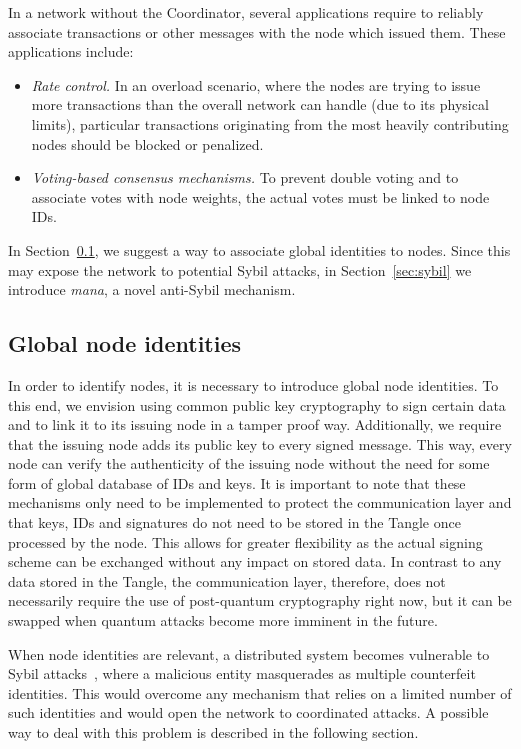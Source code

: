 \documentclass[../main.tex]{subfiles}
\begin{document}
In a network without the Coordinator, several applications require to reliably associate transactions or other messages with the node which issued them.
These applications include:

\begin{itemize}
    \item \textit{Rate control.}
    In an overload scenario, where the nodes are trying to issue more transactions than the overall network can handle (due to its physical limits), 
    particular transactions originating from the most heavily 
    contributing nodes should be blocked or penalized.
    \item \textit{Voting-based consensus mechanisms.}
    To prevent double voting and to associate votes with node weights, the actual votes must be linked to node IDs.
\end{itemize}

In Section~\ref{sec:global-node-id}, we suggest a way to associate global identities to nodes. Since this may expose the network to potential Sybil attacks, in Section~\ref{sec:sybil} we introduce \textit{mana}, a novel anti-Sybil mechanism. 

\subsection{Global node identities}\label{sec:global-node-id}

In order to identify nodes, it is necessary to introduce global node identities.
To this end, we envision using common public key cryptography to sign certain data and to link it to its issuing node in a tamper proof way.
Additionally, we require that the issuing node adds its public key to every signed message.
This way, every node can verify the authenticity of the issuing node without the need for some form of global database of IDs and keys.
It is important to note that these mechanisms only need to be implemented to protect the communication layer and that keys, IDs and signatures do not need to be stored in the Tangle once processed by the node.
This allows for greater flexibility as the actual signing scheme can be exchanged without any impact on stored data.
In contrast to any data stored in the Tangle, the communication layer, therefore, does not necessarily require the use of post-quantum cryptography right now, but it can be swapped when quantum attacks become more imminent in the future.

When node identities are relevant, a distributed system becomes vulnerable to Sybil attacks~\cite{douceur2002}, where a malicious entity masquerades as multiple counterfeit identities.
This would overcome any mechanism that relies on a limited number of such identities and would open the network to coordinated attacks. A possible way to deal with this problem is described in the following section.
\end{document}
